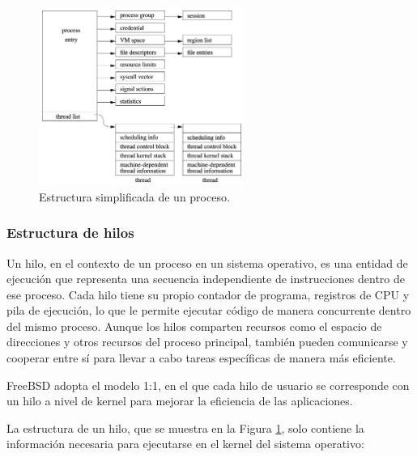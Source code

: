 \begin{figure}[H]
    \centering
    \includegraphics[width=0.6\textwidth]{images/processStructure.png}
    \caption{Estructura simplificada de un proceso.}
    \label{fig:process_state}
\end{figure}

\subsubsection{Estructura de hilos}
Un hilo, en el contexto de un proceso en un sistema operativo, es una entidad de ejecución que representa una secuencia independiente de instrucciones dentro de ese proceso. Cada hilo tiene su propio contador de programa, registros de CPU y pila de ejecución, lo que le permite ejecutar código de manera concurrente dentro del mismo proceso. Aunque los hilos comparten recursos como el espacio de direcciones y otros recursos del proceso principal, también pueden comunicarse y cooperar entre sí para llevar a cabo tareas específicas de manera más eficiente.\par

FreeBSD adopta el modelo 1:1, en el que cada hilo de usuario se corresponde con un hilo a nivel de kernel para mejorar la eficiencia de las aplicaciones.\par

La estructura de un hilo, que se muestra en la Figura \ref{fig:process_state}, solo contiene la información necesaria para ejecutarse en el kernel del sistema operativo:

